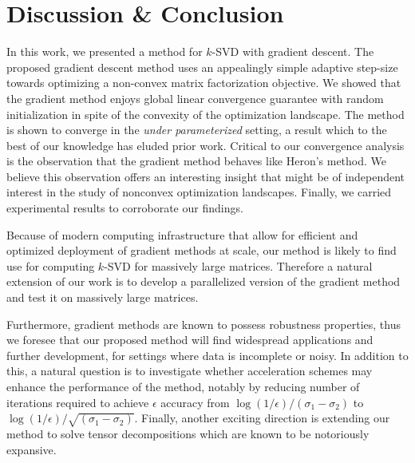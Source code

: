 \section{Discussion \& Conclusion}\label{sec:discussion}

In this work, we presented a method for $k$-SVD with gradient descent. The proposed  gradient descent method uses an appealingly  simple adaptive step-size towards optimizing a non-convex matrix factorization objective. We showed that the gradient method enjoys global linear convergence guarantee with random initialization in spite of the convexity of the optimization landscape. The method is shown to converge in the \emph{under parameterized} setting, a result which to the best of our knowledge has eluded prior work. Critical to our convergence analysis is the observation that the gradient method behaves like Heron's method. We believe this observation offers an interesting insight that might be of independent interest in the study of nonconvex optimization landscapes. Finally, we carried experimental results to corroborate our findings. 

Because of modern computing infrastructure that allow for efficient and optimized deployment of gradient methods at scale, our method is likely to find use for computing $k$-SVD for massively large matrices. Therefore a natural extension of our work is to develop a parallelized version of the gradient method and test it on massively large matrices.     

Furthermore, gradient methods are known to possess robustness properties, thus we foresee that our proposed method will find widespread applications and further development, for settings where data is incomplete or noisy.  In addition to this, a natural question is to investigate whether acceleration schemes may enhance the performance of the method, notably by reducing number of iterations required to achieve $\epsilon$ accuracy from $\log(1/\epsilon)/ (\sigma_1 - \sigma_2)$ to $\log(1/\epsilon)/ \sqrt{(\sigma_1 - \sigma_2)}$. Finally, another exciting direction is extending our method to solve tensor decompositions which are  known to be notoriously expansive.
      






